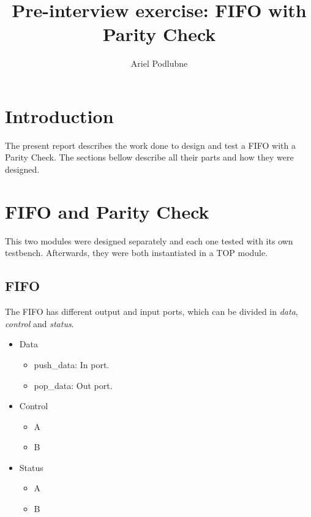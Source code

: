 \documentclass[12pt]{article}
\begin{document}
 

\newcommand{\newtext}[1]{\textcolor[rgb]{0.55,0.47,0.06}{#1}}

\newcommand{\mytext}[1]{{\normalfont{\textit{#1}}}}
\newcommand{\fifo}{FIFO\xspace}
\newcommand{\paritycheck}{Parity Check\xspace}

\title{Pre-interview exercise: FIFO with Parity Check}
\author{Ariel Podlubne}
\maketitle
 
\section{Introduction}
The present report describes the work done to design and test a \fifo with a \paritycheck. The sections bellow describe all their parts and how they were designed.
 
\section{\fifo and \paritycheck}
\label{sec:fifo and paritycheck}
This two modules were designed separately and each one tested with its own testbench. Afterwards, they were both instantiated in a TOP module.

\subsection{\fifo}
The \fifo has different output and input ports, which can be divided in \textit{data}, \textit{control} and \textit{status}.

\begin{itemize}
	\item Data
	\begin{itemize}
		\item push\_data: In port.
		\item pop\_data: Out port.
	\end{itemize}
	\item Control
	\begin{itemize}
		\item A
		\item B
	\end{itemize}
	\item Status
	\begin{itemize}
		\item A
		\item B
	\end{itemize}
\end{itemize}
\end{document}
